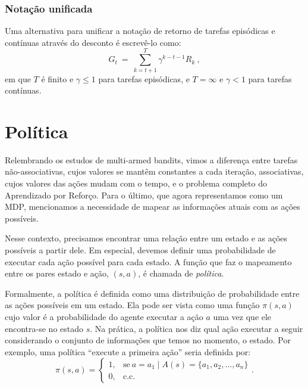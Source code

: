 \documentclass{article}
\begin{document}
            \subsubsection{Notação unificada}

                Uma alternativa para unificar a notação de retorno de tarefas episódicas e contínuas através do desconto é escrevê-lo como:
                \begin{equation}
                    G_t \ = \ \sum_{k=t+1}^{T} \gamma^{k-t-1} R_k\ ,
                \end{equation}
                em que $T$ é finito e $\gamma \leq 1$ para tarefas episódicas, e $T = \infty$ e $\gamma < 1$ para tarefas contínuas.
           
    \section{Política}
    
        Relembrando os estudos de multi-armed bandits, vimos a diferença entre tarefas não-associativas, cujos valores se mantêm constantes a cada iteração, associativas, cujos valores das ações mudam com o tempo, e o problema completo do Aprendizado por Reforço. Para o último, que agora representamos como um MDP, mencionamos a necessidade de mapear as informações atuais com as ações possíveis.

        Nesse contexto, precisamos encontrar uma relação entre um estado e as ações possíveis a partir dele. Em especial, devemos definir uma probabilidade de executar cada ação possível para cada estado. A função que faz o mapeamento entre os pares estado e ação, $(s, a)$, é chamada de \emph{política}. 
        
        Formalmente, a política é definida como uma distribuição de probabilidade entre as ações possíveis em um estado. Ela pode ser vista como uma função $\pi(s, a)$ cujo valor é a probabilidade do agente executar a ação $a$ uma vez que ele encontra-se no estado $s$. Na prática, a política nos diz qual ação executar a seguir considerando o conjunto de informações que temos no momento, o estado. Por exemplo, uma política ``execute a primeira ação'' seria definida por:
        \begin{equation}
            \pi(s, a) =
            \begin{cases}
                1, & \text{se}\ a = a_1 \mid A(s) = \{a_1, a_2, \dots, a_n\}\\
                0, & \text{c.c.}
            \end{cases}
            .
        \end{equation}
    
\end{document}
